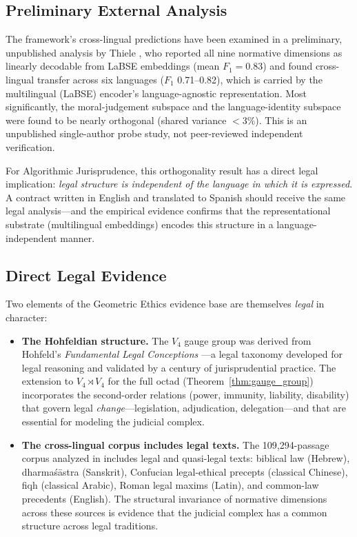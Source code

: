 \documentclass[12pt]{article}
\theoremstyle{definition}
\theoremstyle{remark}
\begin{document}
\subsection{Preliminary External Analysis}

The framework's cross-lingual predictions have been examined in a preliminary, unpublished analysis by Thiele \cite{thiele2026}, who reported all nine normative dimensions as linearly decodable from LaBSE embeddings (mean $F_1 = 0.83$) and found cross-lingual transfer across six languages ($F_1$ 0.71--0.82), which is carried by the multilingual (LaBSE) encoder's language-agnostic representation.  Most significantly, the moral-judgement subspace and the language-identity subspace were found to be nearly orthogonal (shared variance $< 3\%$). This is an unpublished single-author probe study, not peer-reviewed independent verification.

For Algorithmic Jurisprudence, this orthogonality result has a direct legal implication: \emph{legal structure is independent of the language in which it is expressed}.  A contract written in English and translated to Spanish should receive the same legal analysis---and the empirical evidence confirms that the representational substrate (multilingual embeddings) encodes this structure in a language-independent manner.

\subsection{Direct Legal Evidence}

Two elements of the Geometric Ethics evidence base are themselves \emph{legal} in character:

\begin{itemize}
    \item \textbf{The Hohfeldian structure.}  The $V_4$ gauge group was derived from Hohfeld's \emph{Fundamental Legal Conceptions} \cite{hohfeld1913}---a legal taxonomy developed for legal reasoning and validated by a century of jurisprudential practice.  The extension to $V_4 \rtimes V_4$ for the full octad (Theorem~\ref{thm:gauge_group}) incorporates the second-order relations (power, immunity, liability, disability) that govern legal \emph{change}---legislation, adjudication, delegation---and that are essential for modeling the judicial complex.

    \item \textbf{The cross-lingual corpus includes legal texts.}  The 109,294-passage corpus analyzed in \cite{anon2026a} includes legal and quasi-legal texts: biblical law (Hebrew), dharma\'{s}\={a}stra (Sanskrit), Confucian legal-ethical precepts (classical Chinese), fiqh (classical Arabic), Roman legal maxims (Latin), and common-law precedents (English).  The structural invariance of normative dimensions across these sources is evidence that the judicial complex has a common structure across legal traditions.
\end{itemize}
\end{document}

